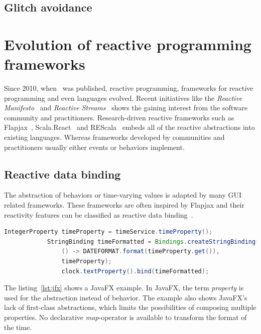 \documentclass[acmsmall]{acmart}\settopmatter{printfolios=true,printccs=false,printacmref=false}
\begin{document}
	\subsection{Glitch avoidance}

\section{Evolution of reactive programming frameworks}
	Since 2010, when~\cite{Maier:2010} was published, reactive programming, 
	frameworks for reactive programming and even languages evolved.
	Recent initiatives like the \textit{Reactive Manifesto}~\cite{reactiveManifesto2014} and
	\textit{Reactive Streams}~\cite{reactiveStreams} shows the gaining interest from the software community and practitioners.
	Research-driven reactive frameworks such as Flapjax~\cite{Meyerovich:2009}, 
	Scala.React~\cite{Maier:2012} and REScala~\cite{Salvaneschi:2014} embeds all of the reactive abstractions into existing languages.
	Whereas frameworks developed by communities and practitioners usually either events or behaviors implement.

	\subsection{Reactive data binding}
		The abstraction of behaviors or time-varying values is adapted by many GUI related frameworks.
		These frameworks are often inspired by Flapjax and their 
		reactivity features can be classified as reactive data binding~\cite{Maier:2010}.

		\begin{lstlisting}[style=myScalastyle,frame=none,language=java, caption={JavaFX-properties: The time, 
			provided by the \lstinline|timeService| is bound to a formatter-binding and the 
			formatted time is then bound to a UI-Label called \lstinline|clock|
			}, label={lst:jfx}]
			IntegerProperty timeProperty = timeService.timeProperty();
			StringBinding timeFormatted = Bindings.createStringBinding(
				() -> DATEFORMAT.format(timeProperty.get()),
				timeProperty);
				clock.textProperty().bind(timeFormatted);
		\end{lstlisting}
		The listing~\ref{lst:jfx} shows a JavaFX example. 
		In JavaFX, the term \textit{property} is used for the abstraction instead of behavior. 
		The example also shows JavaFX's lack of first-class abstractions,
		which limits the possibilities of composing multiple properties. 
		No declarative \textit{map}-operator is available to transform the format of the time.
\end{document}
